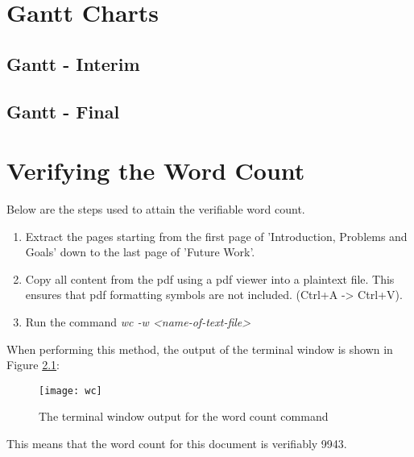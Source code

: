 \chapter{Gantt Charts}
\newpage
\section{Gantt - Interim} \label{gc-interim}
\begin{center}
\end{center}

\section{Gantt - Final} \label{gc-final}
\begin{center}
\end{center}

\chapter{Verifying the Word Count}
Below are the steps used to attain the verifiable word count.
\begin{enumerate}
	\item Extract the pages starting from the first page of 'Introduction, Problems and Goals' down to the last page of 'Future Work'.
	\item Copy all content from the pdf using a pdf viewer into a plaintext file. This ensures that pdf formatting symbols are not included. (Ctrl+A -> Ctrl+V).
	\item Run the command \emph{wc -w <name-of-text-file>}
\end{enumerate}

When performing this method, the output of the terminal window is shown in Figure \ref{wc}:\\

\begin{figure}[H]
	\centering
	\texttt{[image: wc]}
	\caption{The terminal window output for the word count command} \label{wc}
\end{figure}

This means that the word count for this document is verifiably 9943.

